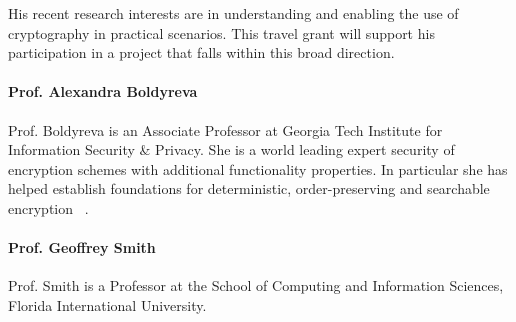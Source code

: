 His recent research interests are in understanding and enabling the use of cryptography in practical scenarios.  This travel grant will support his participation in a project that falls within this broad direction.


\paragraph{Prof. Alexandra Boldyreva}
Prof. Boldyreva is an Associate Professor at Georgia Tech Institute for Information Security \& Privacy.  She is a world leading expert security of encryption schemes with additional functionality properties. In particular she has helped establish foundations for deterministic, order-preserving and searchable encryption ~\cite{}.


\paragraph{Prof. Geoffrey Smith}
Prof. Smith is a Professor at the School of Computing and Information Sciences, Florida International University. 


